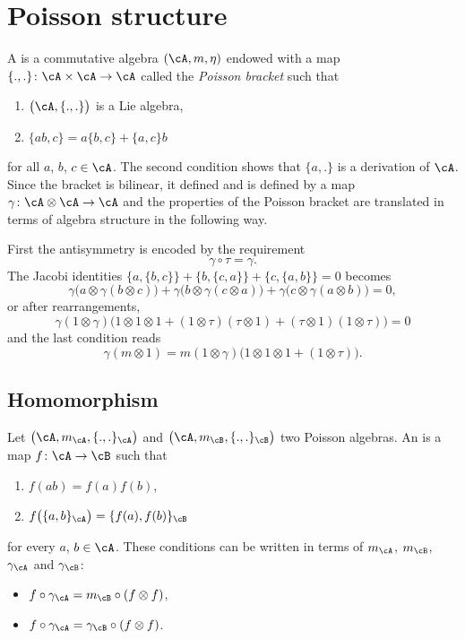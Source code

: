 \section{Poisson structure}

A  is a commutative algebra $(\cA,m,\eta)$ endowed with a map $\{ .,. \}\colon \cA\times\cA\to \cA$ called the \emph{Poisson bracket} such that
\begin{enumerate}
	\item $\big( \cA,\{ .,. \} \big)$ is a Lie algebra,
	\item $\{ ab,c \}=a\{ b,c \}+\{ a,c \}b$
\end{enumerate}
for all $a$, $b$, $c\in\cA$. The second condition shows that $\{ a,. \}$ is a derivation of $\cA$. Since the bracket is bilinear, it defined and is defined by a map $\gamma\colon \cA\otimes\cA\to \cA$ and the properties of the Poisson bracket are translated in terms of algebra structure in the following way.

First the antisymmetry is encoded by the requirement
\begin{equation}
	\gamma\circ\tau=\gamma.
\end{equation}
The Jacobi identities $\{ a,\{ b,c \} \}+\{ b,\{ c,a \} \}+\{ c,\{ a,b \} \}=0 $ becomes
\[
	\gamma\big( a\otimes \gamma(b\otimes c) \big)+\gamma\big( b\otimes\gamma(c\otimes a) \big)+\gamma\big( c\otimes\gamma(a\otimes b) \big)=0,
\]
or after rearrangements,
\begin{equation}
	\gamma(1\otimes\gamma)\big( 1\otimes 1\otimes 1+(1\otimes\tau)(\tau\otimes 1)+(\tau\otimes 1)(1\otimes\tau) \big)=0
\end{equation}
and the last condition reads
\begin{equation}
	\gamma(m\otimes 1)=m(1\otimes\gamma)\big( 1\otimes 1\otimes 1+(1\otimes\tau) \big).
\end{equation}

\subsection{Homomorphism}

Let $\big( \cA,m_{\cA},\{.,.\}_{\cA} \big)$ and $\big( \cA,m_{\cB},\{.,.\}_{\cB} \big)$ two Poisson algebras. An  is a map $f\colon \cA\to \cB$ such that
\begin{enumerate}
	\item $f(ab)=f(a)f(b)$,
	\item $f\big( \{a,b\}_{\cA} \big)=\{f(a),f(b)\}_{\cB}$
\end{enumerate}
for every $a$, $b\in\cA$. These conditions can be written in terms of $m_{\cA}$, $m_{\cB}$, $\gamma_{\cA}$ and $\gamma_{\cB}$:
\begin{itemize}
	\item $f\circ \gamma_{\cA}=m_{\cB}\circ(f\otimes f)$,
	\item $f\circ \gamma_{\cA}=\gamma_{\cB}\circ(f\otimes f)$.
\end{itemize}

